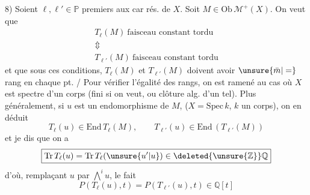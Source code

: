 8) Soient $\ell,\ell'\in\mathbb P$ premiers aux car rés. %
de $X$. Soit $M\in\mathrm{Ob}\,\mathcal M^+(X)$. On veut %
que %
\[
\begin{gathered}
T_\ell(M)\ \text{faisceau constant tordu}\\ %
\Updownarrow\\ %
T_{\ell'}(M)\ \text{faisceau constant tordu} %
\end{gathered}
\]
et que sous ces conditions, $T_\ell(M)$ et %
$T_{\ell'}(M)$ doivent avoir $\unsure{\bar m|=}$ rang en chaque %
pt. / Pour vérifier l'égalité des rangs, on %
est ramené au cas où $X$ est  spectre d'un %
corps (fini si on veut,  ou clôture alg. %
d'un tel). Plus généralement, si %
$u$ est un endomorphisme de $M$,  %
($X=\mathrm{Spec}\,k$, $k$ un corps), on en déduit %
\[
T_\ell(u)\in\mathrm{End}\,T_\ell(M),\qquad T_{\ell'}(u)\in\mathrm{End}\,(T_{\ell'}(M)) %
\]
et je dis que on a %
\[
\boxed{\mathrm{Tr}\,T_\ell(u)=\mathrm{Tr}\,T_\ell(\unsure{u'|u})\in\deleted{\unsure{\mathbb Z}}\mathbb Q} %
\]
d'où, remplaçant $u$ par $\bigwedge^i u$, le fait %
\[
\boxed{P(T_\ell(u),t)=P(T_{\ell'}(u),t)\in\mathbb Q[t]} %
\]

